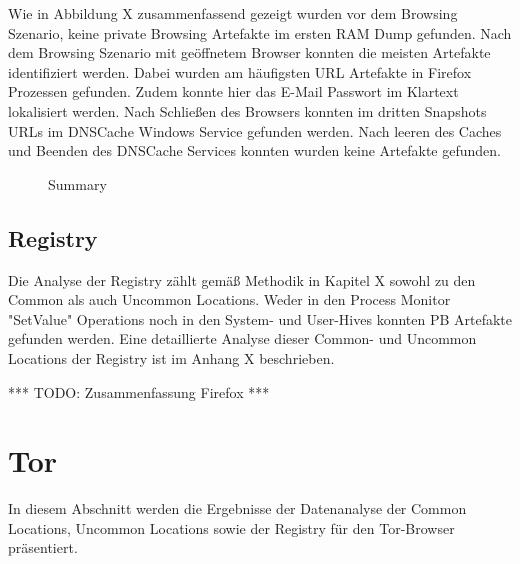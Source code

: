 Wie in Abbildung X zusammenfassend gezeigt wurden vor dem Browsing Szenario, keine private Browsing Artefakte im ersten RAM Dump gefunden.
Nach dem Browsing Szenario mit geöffnetem Browser konnten die meisten Artefakte identifiziert werden. Dabei wurden am häufigsten URL Artefakte in Firefox Prozessen gefunden. Zudem konnte hier das E-Mail Passwort im Klartext lokalisiert werden.
Nach Schließen des Browsers konnten im dritten Snapshots URLs im DNSCache Windows Service gefunden werden. Nach leeren des Caches und Beenden des DNSCache Services konnten wurden keine Artefakte gefunden.
\begin{figure}[h!]
	\centerline{}
	\label{chart:final-criteria}  
	\caption{Summary}
\end{figure}


\subsection*{Registry}

Die Analyse der Registry zählt gemäß Methodik in Kapitel X sowohl zu den Common als auch Uncommon Locations. Weder in den Process Monitor "SetValue" Operations noch in den System- und User-Hives konnten PB Artefakte gefunden werden. Eine detaillierte Analyse dieser Common- und Uncommon Locations der Registry ist im Anhang X beschrieben.


*** TODO: Zusammenfassung Firefox ***


\newpage




\section{Tor}

In diesem Abschnitt werden die Ergebnisse der Datenanalyse der Common Locations, Uncommon Locations sowie der Registry für den Tor-Browser präsentiert.


